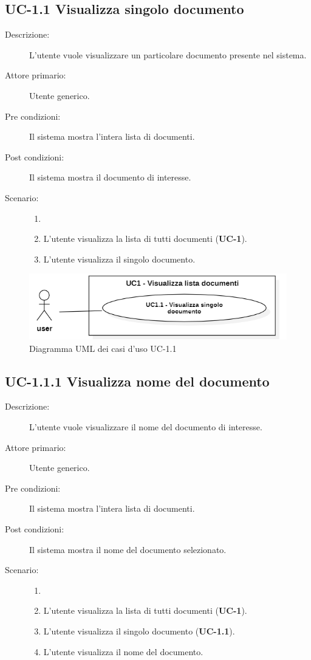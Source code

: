 \subsection{UC-1.1 Visualizza singolo documento}
\begin{description}
    \item[Descrizione:] L'utente vuole visualizzare un particolare documento presente nel sistema.
    \item[Attore primario:] Utente generico.
    \item[Pre condizioni:] Il sistema mostra l’intera lista di documenti.
    \item[Post condizioni:] Il sistema mostra il documento di interesse.
    \item[Scenario:]
    \begin{enumerate}
        \item[]
        \item L’utente visualizza la lista di tutti documenti (\textbf{UC-1}).
        \item L'utente visualizza il singolo documento.
    \end{enumerate} 
\end{description}

\begin{figure}[H]
    \centering
    \includegraphics[width=0.8\linewidth]{UC1.1.PNG}
    \caption{Diagramma UML dei casi d'uso UC-1.1}
    \label{fig:UC3.1}
\end{figure}

\subsection{UC-1.1.1 Visualizza nome del documento}
\begin{description}
    \item[Descrizione:] L'utente vuole visualizzare il nome del documento di interesse.
    \item[Attore primario:] Utente generico.
    \item[Pre condizioni:] Il sistema mostra l’intera lista di documenti.
    \item[Post condizioni:] Il sistema mostra il nome del documento selezionato.
    \item[Scenario:]
    \begin{enumerate}
        \item[]
        \item L’utente visualizza la lista di tutti documenti (\textbf{UC-1}).
        \item L'utente visualizza il singolo documento (\textbf{UC-1.1}).
        \item L'utente visualizza il nome del documento.
    \end{enumerate} 
\end{description}

